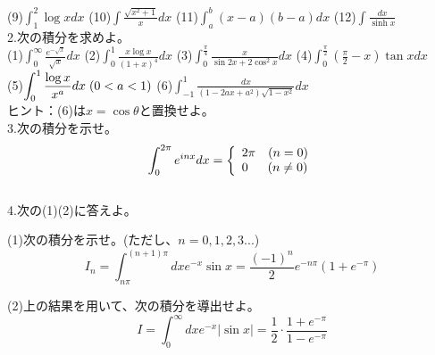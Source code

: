 \documentclass[a4j,dvipdfmx]{jsarticle}
\begin{document}
(9)$\displaystyle \int_1^2\log x dx$
\hspace{22mm}
(10)$\displaystyle \int\frac{\sqrt{x^2+1}}{x}dx$
\hspace{10mm}
(11)$\displaystyle \int_a^b(x-a)(b-a)dx$
\hspace{1mm}
(12)$\displaystyle \int\frac{dx}{\sinh x}$\\

2.次の積分を求めよ。\\

(1)$\displaystyle \int_0^\infty \frac{e^{-\sqrt{x}}}{\sqrt{x}}dx$
\hspace{17mm}
(2)$\displaystyle \int_0^1 \frac{x\log x}{(1+x)^4}dx$
\hspace{10mm}
(3)$\displaystyle \int_0^\frac{\pi}{4}\frac{x}{\sin 2x+2\cos^2 x}dx$
\hspace{10mm}
(4)$\displaystyle \int_0^\frac{\pi}{2} \left(\frac{\pi}{2}-x\right)\tan xdx$\\

(5)$\displaystyle \int_0^1\frac{\log x}{x^{a}}dx\hspace{1mm}(0<a<1)$
\hspace{0.5mm}
(6)$\displaystyle \int_{-1}^1 \frac{dx}{(1-2ax+a^2)\sqrt{1-x^2}}dx$\\

{\scriptsize ヒント：(6)は$x=\cos\theta$と置換せよ。}\\

3.次の積分を示せ。
\begin{equation*}
    \int_0^{2\pi}e^{inx}dx=\left \{
        \begin{array}{l}
            2\pi\quad(n=0)\\
            0 \quad\hspace{2mm}(n\neq 0)
        \end{array}
    \right.
\end{equation*}\\

4.次の(1)(2)に答えよ。

(1)次の積分を示せ。(ただし、$n=0,1,2,3...$)
\begin{equation*}
    I_n=\int_{n\pi}^{(n+1)\pi}dx e^{-x}\sin x=\frac{(-1)^n}{2}e^{-n\pi}(1+e^{-\pi})
\end{equation*}

(2)上の結果を用いて、次の積分を導出せよ。
\begin{equation*}
    I=\int_0^\infty dx e^{-x}|\sin x|=\frac{1}{2}\cdot \frac{1+e^{-\pi}}{1-e^{-\pi}}
\end{equation*}\\
\end{document}
